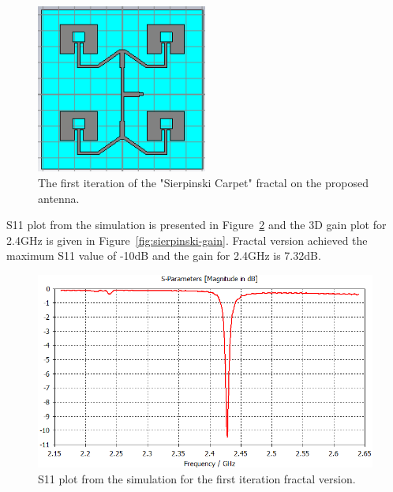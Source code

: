 \documentclass[12pt, oneandhalf, chaparabic, sees, ms]{metu}
\begin{document}
\begin{figure}[!htbp]
 \begin{center}
  \includegraphics[width=0.5\textwidth]{T2x2-rect-pa-corp-feed-FR4-018mm-connected-by-boolean-add-sierpinski1-0625-antenna.png}
 \end{center}
 \caption{The first iteration of the "Sierpinski Carpet" fractal on the proposed antenna.}
  \label{fig:sierpinski-schema}
\end{figure}


\newpage
S11 plot from the simulation is presented in Figure~\ref{fig:sierpinski-s11} and the 3D gain plot for 2.4GHz is given in Figure~\ref{fig:sierpinski-gain}.
Fractal version achieved the maximum S11 value of -10dB and the gain for 2.4GHz is 7.32dB.

\begin{figure}[!htbp]
 \begin{center}
  \includegraphics[width=\textwidth]{T2x2-rect-pa-corp-feed-FR4-018mm-connected-by-boolean-add-sierpinski1-0625-S11.png}
 \end{center}
 \caption{S11 plot from the simulation for the first iteration fractal version.}
  \label{fig:sierpinski-s11}
\end{figure}
\end{document}
